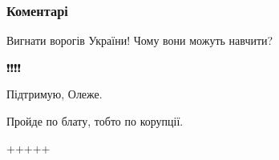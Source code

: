  
 
 
 
 
\subsubsection{Коментарі}

\begin{itemize}
 
Вигнати ворогів України! Чому вони можуть навчити?

 
❗❗❗❗

 
Підтримую, Олеже.


 
Пройде по блату, тобто по корупції.

 
+++++


\end{itemize}
